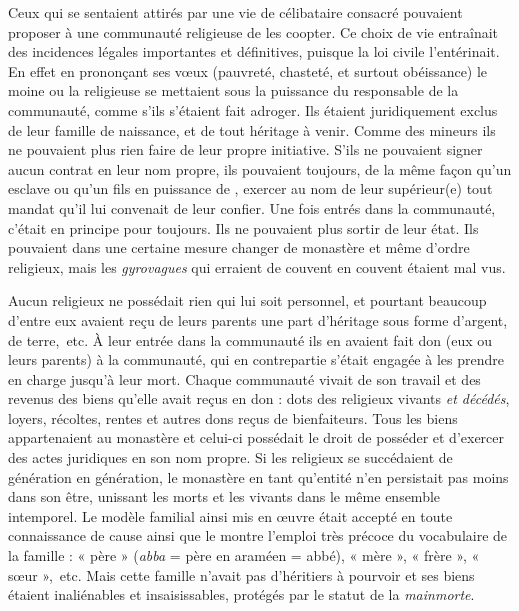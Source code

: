  Ceux qui se sentaient attirés par une vie de célibataire consacré pouvaient proposer à une communauté religieuse de les coopter. Ce choix de vie entraînait des incidences légales importantes et définitives, puisque la loi civile l'entérinait. En effet en prononçant ses vœux (pauvreté, chasteté, et surtout obéissance) le moine ou la religieuse se mettaient sous la puissance du responsable de la communauté, comme s'ils s'étaient fait adroger. Ils étaient juridiquement exclus de leur famille de naissance, et de tout héritage à venir. Comme des mineurs ils ne pouvaient plus rien faire de leur propre initiative. S'ils ne pouvaient signer aucun contrat en leur nom propre, ils pouvaient toujours, de la même façon qu'un esclave ou qu'un fils en puissance de , exercer au nom de leur supérieur(e) tout mandat qu'il lui convenait de leur confier. Une fois entrés dans la communauté, c'était en principe pour toujours. Ils ne pouvaient plus sortir de leur état. Ils pouvaient dans une certaine mesure changer de monastère et même d'ordre religieux, mais les \emph{gyrovagues} qui erraient de couvent en couvent étaient mal vus. 

 Aucun religieux ne possédait rien qui lui soit personnel, et pourtant beaucoup d'entre eux avaient reçu de leurs parents une part d'héritage sous forme d'argent, de terre,~etc. À leur entrée dans la communauté ils en avaient fait don (eux ou leurs parents) à la communauté, qui en contrepartie s'était engagée à les prendre en charge jusqu'à leur mort. Chaque communauté vivait de son travail et des revenus des biens qu'elle avait reçus en don : dots des religieux vivants \emph{et décédés}, loyers, récoltes, rentes et autres dons reçus de bienfaiteurs. Tous les biens appartenaient au monastère et celui-ci possédait le droit de posséder et d'exercer des actes juridiques en son nom propre. Si les religieux se succédaient de génération en génération, le monastère en tant qu'entité n'en persistait pas moins dans son être, unissant les morts et les vivants dans le même ensemble intemporel. Le modèle familial ainsi mis en œuvre était accepté en toute connaissance de cause ainsi que le montre l'emploi très précoce du vocabulaire de la famille : « père » (\emph{abba} = père en araméen = abbé), « mère », « frère », « sœur »,~etc. Mais cette famille n'avait pas d'héritiers à pourvoir et ses biens étaient inaliénables et insaisissables, protégés par le statut de la \emph{mainmorte}. 
 
